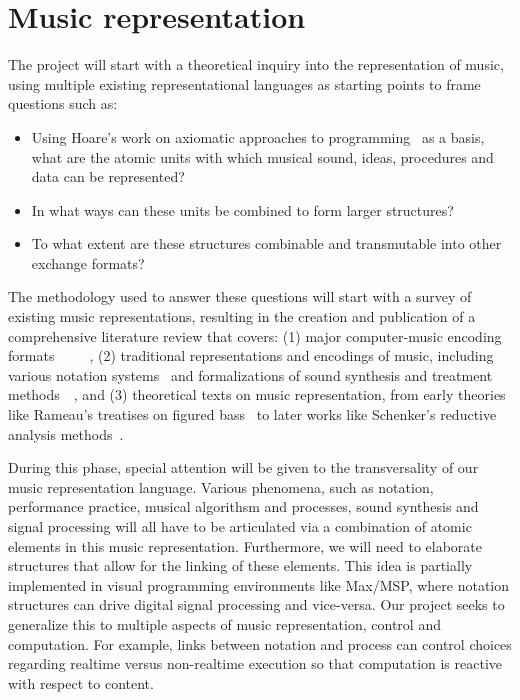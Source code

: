 \documentclass{article}
\begin{document}
\section{Music representation}\label{sec:music-representation}
The project will start with a theoretical inquiry into the representation of
music, using multiple existing representational languages as starting points
to frame questions such as:
\begin{itemize}
\item Using Hoare's work on axiomatic approaches to
programming~\cite{hoare1969axiomatic} as a basis, what are the atomic units
with which musical sound, ideas, procedures and data can be represented?
\item In what ways can these units be combined to form
larger structures?
\item To what extent are these structures combinable and transmutable into
other exchange formats?
\end{itemize}

The methodology used to answer these questions will start with a survey of
existing music representations, resulting in the creation and publication of
a comprehensive literature review that covers: (1) major computer-music
encoding
formats~\cite{hoos98}~\cite{lilypond06}~\cite{good2001musicxml}~\cite{alvaro2010musicjson}~\cite{roland2002music},
(2) traditional representations and encodings of music,
including various notation systems~\cite{hultberg2000printed} and formalizations
of sound synthesis and treatment
methods~\cite{mason1953feedback}~\cite{foote1999visualizing},
and (3) theoretical texts on music representation, from
early theories like Rameau's treatises on figured bass~\cite{rameau:1722} to later works
like Schenker’s reductive analysis methods~\cite{schenker:1935}.

During this phase, special attention will be given to the transversality of
our music representation language.  Various phenomena, such as notation,
performance practice, musical algorithsm and processes, sound synthesis and
signal processing will all have to be articulated via a combination of
atomic elements in this music representation.  Furthermore, we will need to
elaborate structures that allow for the linking of these elements.
This idea is partially implemented in visual programming environments like Max/MSP, where notation
structures can drive digital signal processing and vice-versa. Our project
seeks to generalize this to multiple aspects of music representation, control and
computation. For example, links between notation and process can control choices regarding
real\-time versus non-real\-time execution so that computation is reactive with
respect to content.
\end{document}
